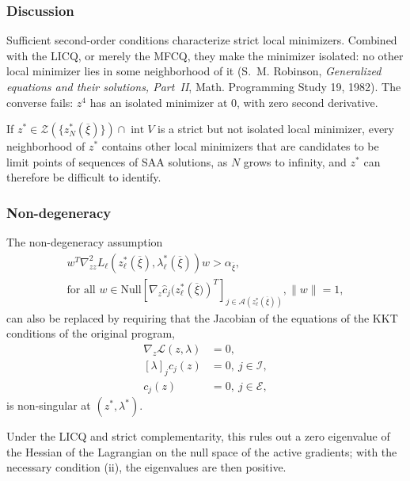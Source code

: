 \documentclass[aspectratio=169]{beamer}
\begin{document}
\begin{frame}
\frametitle{Discussion}

Sufficient second-order conditions characterize {\red strict} local minimizers. Combined with the LICQ, or merely the MFCQ, they make the minimizer {\red isolated}: no other local minimizer lies in some neighborhood of it (S.~M. Robinson, {\sl Generalized equations and their solutions, Part~II}, Math. Programming Study 19, 1982).
The converse fails: $z^4$ has an isolated minimizer at $0$, with zero second derivative.



\mbox{}

If $z^* \in\mathcal{Z} \left(\lbrace z^*_N(\overline{\xi})\rbrace\right)
\cap \operatorname{int} V$ is a strict but not isolated local minimizer, every neighborhood of $z^*$ contains other local minimizers that are candidates to be limit points of sequences of SAA solutions, as $N$ grows to infinity, and $z^*$ can therefore be difficult to identify.

\end{frame}

\begin{frame}
\frametitle{Non-degeneracy}
\small

The non-degeneracy assumption
\begin{multline*}
w^T \nabla_{zz}^2 L_{\ell} \left(z^*_{\ell}(\overline{\xi}),
\lambda^*_{\ell}(\overline{\xi}) \right) w > \alpha_{\overline{\xi}}, \\
\text{for all }w \in
\text{Null}\left[\nabla_z \hat{c}_j(z^*_{\ell} \left( \overline{\xi})
  \right)^T \right]_{j \in \mathcal{A} (z^*_{\ell}(\overline{\xi})) },
 \|w\|=1,
\end{multline*}
can also be replaced by requiring that the Jacobian of the equations of the KKT conditions of the original program,
\begin{align*}
\nabla_z \mathcal{L}(z, \lambda) & = 0,\\
[\lambda]_j c_j(z) & = 0,\ j \in \mathcal{I},\\
c_j(z) & = 0,\ j \in \mathcal{E},
\end{align*}
is non-singular at $(z^*, \lambda^*)$.

\mbox{}

{\footnotesize Under the LICQ and strict complementarity, this rules out a zero eigenvalue of the Hessian of the Lagrangian on the null space of the active gradients; with the necessary condition (ii), the eigenvalues are then positive.}

\end{frame}
\end{document}
